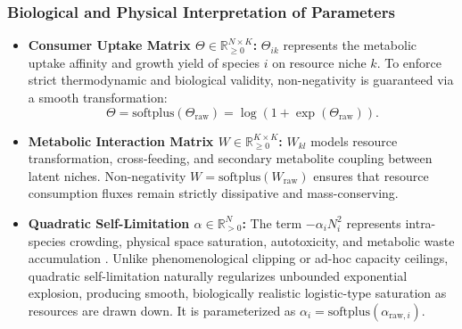\subsubsection{Biological and Physical Interpretation of Parameters}
\begin{itemize}
    \item \textbf{Consumer Uptake Matrix $\Theta \in \mathbb{R}_{\ge 0}^{N \times K}$:} $\Theta_{ik}$ represents the metabolic uptake affinity and growth yield of species $i$ on resource niche $k$. To enforce strict thermodynamic and biological validity, non-negativity is guaranteed via a smooth transformation:
    \begin{equation}
        \Theta = \text{softplus}(\Theta_{\text{raw}}) = \log(1 + \exp(\Theta_{\text{raw}})).
    \end{equation}
    \item \textbf{Metabolic Interaction Matrix $W \in \mathbb{R}_{\ge 0}^{K \times K}$:} $W_{kl}$ models resource transformation, cross-feeding, and secondary metabolite coupling between latent niches. Non-negativity $W = \text{softplus}(W_{\text{raw}})$ ensures that resource consumption fluxes remain strictly dissipative and mass-conserving.
    \item \textbf{Quadratic Self-Limitation $\alpha \in \mathbb{R}_{> 0}^N$:} The term $-\alpha_i N_i^2$ represents intra-species crowding, physical space saturation, autotoxicity, and metabolic waste accumulation \citep{macarthur1970species, posfai2017versatility}. Unlike phenomenological clipping or ad-hoc capacity ceilings, quadratic self-limitation naturally regularizes unbounded exponential explosion, producing smooth, biologically realistic logistic-type saturation as resources are drawn down. It is parameterized as $\alpha_i = \text{softplus}(\alpha_{\text{raw}, i})$.
\end{itemize}

